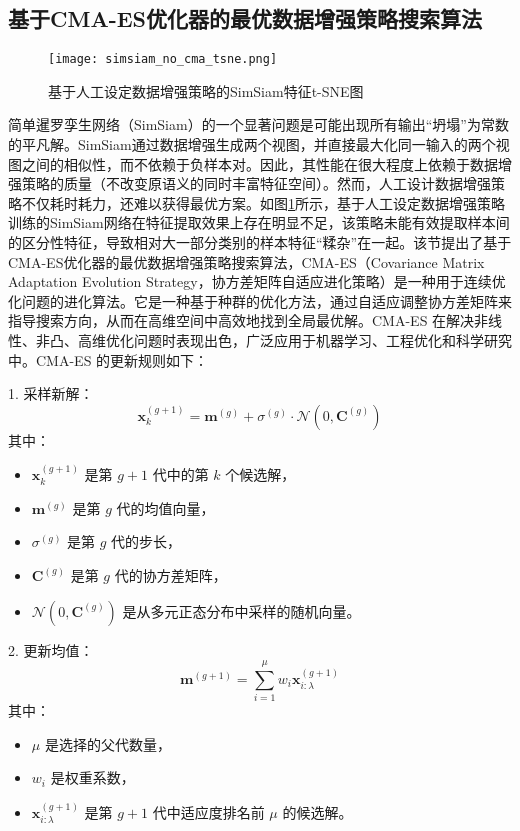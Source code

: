\documentclass[master]{thesis-uestc}
\begin{document}
\subsection{基于CMA-ES优化器的最优数据增强策略搜索算法}
\begin{figure}[h]
    \centering
    \texttt{[image: simsiam\_no\_cma\_tsne.png]}
    \caption{基于人工设定数据增强策略的SimSiam特征t-SNE图}
    \label{simsiam_no_cma_tsne}
\end{figure}
简单暹罗孪生网络（SimSiam）的一个显著问题是可能出现所有输出“坍塌”为常数的平凡解。SimSiam通过数据增强生成两个视图，并直接最大化同一输入的两个视图之间的相似性，而不依赖于负样本对。因此，其性能在很大程度上依赖于数据增强策略的质量（不改变原语义的同时丰富特征空间）。然而，人工设计数据增强策略不仅耗时耗力，还难以获得最优方案。如图\ref{simsiam_no_cma_tsne}所示，基于人工设定数据增强策略训练的SimSiam网络在特征提取效果上存在明显不足，该策略未能有效提取样本间的区分性特征，导致相对大一部分类别的样本特征“糅杂”在一起。该节提出了基于CMA-ES优化器的最优数据增强策略搜索算法，CMA-ES（Covariance Matrix Adaptation Evolution Strategy，协方差矩阵自适应进化策略）是一种用于连续优化问题的进化算法。它是一种基于种群的优化方法，通过自适应调整协方差矩阵来指导搜索方向，从而在高维空间中高效地找到全局最优解。CMA-ES 在解决非线性、非凸、高维优化问题时表现出色，广泛应用于机器学习、工程优化和科学研究中。CMA-ES 的更新规则如下：

1. 采样新解：
\begin{equation}
\mathbf{x}_k^{(g+1)} = \mathbf{m}^{(g)} + \sigma^{(g)} \cdot \mathcal{N}(0, \mathbf{C}^{(g)})
\label{eq:sample}
\end{equation}
其中：
\begin{itemize}
    \item \(\mathbf{x}_k^{(g+1)}\) 是第 \(g+1\) 代中的第 \(k\) 个候选解，
    \item \(\mathbf{m}^{(g)}\) 是第 \(g\) 代的均值向量，
    \item \(\sigma^{(g)}\) 是第 \(g\) 代的步长，
    \item \(\mathbf{C}^{(g)}\) 是第 \(g\) 代的协方差矩阵，
    \item \(\mathcal{N}(0, \mathbf{C}^{(g)})\) 是从多元正态分布中采样的随机向量。
\end{itemize}

2. 更新均值：
\begin{equation}
\mathbf{m}^{(g+1)} = \sum_{i=1}^{\mu} w_i \mathbf{x}_{i:\lambda}^{(g+1)}
\label{eq:mean_update}
\end{equation}
其中：
\begin{itemize}
    \item \(\mu\) 是选择的父代数量，
    \item \(w_i\) 是权重系数，
    \item \(\mathbf{x}_{i:\lambda}^{(g+1)}\) 是第 \(g+1\) 代中适应度排名前 \(\mu\) 的候选解。
\end{itemize}
\end{document}
